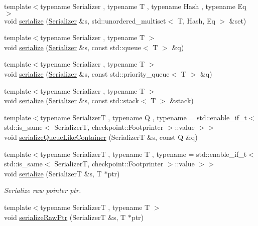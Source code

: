 \begin{DoxyCompactItemize}
{\footnotesize template$<$typename Serializer , typename T , typename Hash , typename Eq $>$ }\\void \hyperlink{namespacecheckpoint_a64c8a1aa29d469bc71c88a8836264ecc}{serialize} (\hyperlink{structcheckpoint_1_1_serializer}{Serializer} \&s, std\+::unordered\+\_\+multiset$<$ T, Hash, Eq $>$ \&set)
\item 
{\footnotesize template$<$typename Serializer , typename T $>$ }\\void \hyperlink{namespacecheckpoint_a5621e2549443d76acad6c83fdfdcbeab}{serialize} (\hyperlink{structcheckpoint_1_1_serializer}{Serializer} \&s, const std\+::queue$<$ T $>$ \&q)
\item 
{\footnotesize template$<$typename Serializer , typename T $>$ }\\void \hyperlink{namespacecheckpoint_a9493433bed418b54358130463961ce50}{serialize} (\hyperlink{structcheckpoint_1_1_serializer}{Serializer} \&s, const std\+::priority\+\_\+queue$<$ T $>$ \&q)
\item 
{\footnotesize template$<$typename Serializer , typename T $>$ }\\void \hyperlink{namespacecheckpoint_a1d399ef63dc7723f1b4387e4605b3259}{serialize} (\hyperlink{structcheckpoint_1_1_serializer}{Serializer} \&s, const std\+::stack$<$ T $>$ \&stack)
\item 
{\footnotesize template$<$typename SerializerT , typename Q , typename  = std\+::enable\+\_\+if\+\_\+t$<$    std\+::is\+\_\+same$<$      Serializer\+T,      checkpoint\+::\+Footprinter    $>$\+::value  $>$$>$ }\\void \hyperlink{namespacecheckpoint_a33956387419a85cfe810fbce88f5bdf9}{serialize\+Queue\+Like\+Container} (SerializerT \&s, const Q \&q)
\item 
{\footnotesize template$<$typename SerializerT , typename T , typename  = std\+::enable\+\_\+if\+\_\+t$<$    std\+::is\+\_\+same$<$      Serializer\+T,      checkpoint\+::\+Footprinter    $>$\+::value  $>$$>$ }\\void \hyperlink{namespacecheckpoint_a5242b8701b19ff5eeb7587fb4a07bfe9}{serialize} (SerializerT \&s, T $\ast$ptr)
\begin{DoxyCompactList}\small\item\em Serialize raw pointer {\ttfamily ptr}. \end{DoxyCompactList}\item 
{\footnotesize template$<$typename SerializerT , typename T $>$ }\\void \hyperlink{namespacecheckpoint_a6113644a35f5023a57e2ed3ca4814490}{serialize\+Raw\+Ptr} (SerializerT \&s, T $\ast$ptr)

\end{DoxyCompactItemize}
